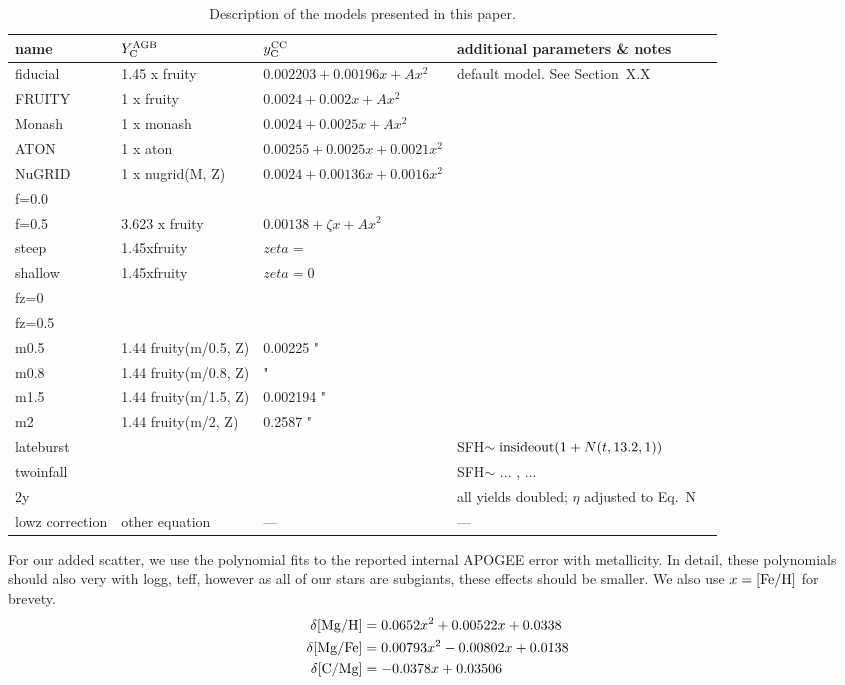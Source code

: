 \documentclass[fleqn,
usenatbib]{mnras}
\begin{document}
\begin{table}
	\centering
    \caption[]{Description of the models presented in this paper.}
	\label{tab:model_parameters}

	\begin{tabular}{l l l l l}
		\hline
            name & $Y_{\rm C}^{\rm AGB}$ & $y_{\rm C}^{\rm CC}$ & additional parameters \& notes \\
            \hline
            fiducial & 1.45 x fruity & $0.002203 + 0.00196x + Ax^2$ & default model. See Section~X.X \\
            FRUITY & 1 x fruity & $0.0024 + 0.002x + Ax^2$ \\
            Monash & 1 x monash & $0.0024 + 0.0025x + Ax^2$ \\
            ATON & 1 x aton & $0.00255 + 0.0025x + 0.0021 x^2$& \\
            NuGRID & 1 x nugrid(M, Z) & $0.0024 + 0.00136x + 0.0016x^2$& \\
            f=0.0 &  \\
            f=0.5 & 3.623 x fruity & $0.00138 + \zeta x + Ax^2$ & \\
            steep & 1.45xfruity & $zeta=$ \\
            shallow & 1.45xfruity & $zeta=0$ \\
            fz=0 \\
            fz=0.5 \\
            m0.5 & 1.44 fruity(m/0.5, Z)  & 0.00225 " & \\
            m0.8 & 1.44 fruity(m/0.8, Z) & " \\
            m1.5 & 1.44 fruity(m/1.5, Z) & 0.002194 " \\
            m2 & 1.44 fruity(m/2, Z) & 0.2587 " \\
            lateburst & & & SFH$\sim {\rm insideout} (1+N(t, 13.2, 1))$\\
            twoinfall & & & SFH$\sim$ ... , ... \\
            2y & & & all yields doubled;  $\eta$ adjusted to Eq.~N \\
            lowz correction& other equation & --- & --- \\
		\hline
	\end{tabular}
\end{table}



For our added scatter, we use the polynomial fits to the reported internal APOGEE error with metallicity. In detail, these polynomials should also very with logg, teff, however as all of our stars are subgiants, these effects should be smaller. We also use $x={\rm [Fe/H]}$ for brevety.
\begin{subequations}
\begin{align}
    \delta {\rm [Mg/H]} &= 0.0652 x^2 + 0.00522 x + 0.0338 \\
    \delta {\rm [Mg/Fe]} &= 0.00793 x^2 - 0.00802 x + 0.0138 \\
    \delta {\rm [C/Mg]} &= -0.0378x + 0.03506 
\end{align}
\end{subequations}
\end{document}
